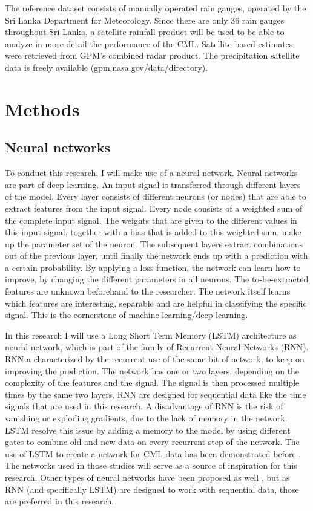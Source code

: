 \documentclass[twocolumn, 10pt, a4paper]{article}
\begin{document}
	The reference dataset consists of manually operated rain gauges, operated by the Sri Lanka Department for Meteorology. Since there are only 36 rain gauges throughout Sri Lanka, a satellite rainfall product will be used to be able to analyze in more detail the performance of the CML. Satellite based estimates were retrieved from GPM's combined radar product. The precipitation satellite data is freely available (gpm.nasa.gov/data/directory).
	
	\section{Methods}
	\subsection{Neural networks}
	To conduct this research, I will make use of a neural network. Neural networks are part of deep learning. An input signal is transferred through different layers of the model. Every layer consists of different neurons (or nodes) that are able to extract features from the input signal. Every node consists of a weighted sum of the complete input signal. The weights that are given to the different values in this input signal, together with a bias that is added to this weighted sum, make up the parameter set of the neuron. 
	The subsequent layers extract combinations out of the previous layer, until finally the network ends up with a prediction with a certain probability. By applying a loss function, the network can learn how to improve, by changing the different parameters in all neurons. The to-be-extracted features are unknown beforehand to the researcher. The network itself learns which features are interesting, separable and are helpful in classifying the specific signal. This is the cornerstone of machine learning/deep learning. 
	
	In this research I will use a Long Short Term Memory (LSTM) architecture as neural network, which is part of the family of Recurrent Neural Networks (RNN). RNN a characterized by the recurrent use of the same bit of network, to keep on improving the prediction. The network has one or two layers, depending on the complexity of the features and the signal. The signal is then processed multiple times by the same two layers. RNN are designed for sequential data like the time signals that are used in this research. A disadvantage of RNN is the risk of vanishing or exploding gradients, due to the lack of memory in the network. LSTM resolve this issue by adding a memory to the model by using different gates to combine old and new data on every recurrent step of the network. The use of LSTM to create a network for CML data has been demonstrated before \cite{Habi2019, Diba2021, Pudashine2020}. The networks used in those studies will serve as a source of inspiration for this research. Other types of neural networks have been proposed as well \cite{Polz2020}, but as RNN (and specifically LSTM) are designed to work with sequential data, those are preferred in this research.
	
\end{document}
